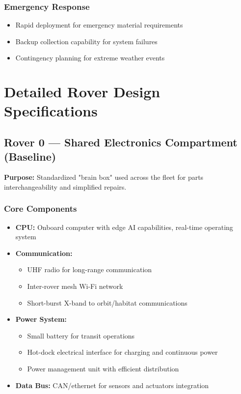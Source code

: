 \documentclass[12pt, a4paper]{article}
\begin{document}
\subsubsection{Emergency Response}
\begin{itemize}
    \item Rapid deployment for emergency material requirements
    \item Backup collection capability for system failures
    \item Contingency planning for extreme weather events
\end{itemize}

\section{Detailed Rover Design Specifications}

\subsection{Rover 0 — Shared Electronics Compartment (Baseline)}

\textbf{Purpose:} Standardized "brain box" used across the fleet for parts interchangeability and simplified repairs.

\subsubsection{Core Components}
\begin{itemize}
    \item \textbf{CPU:} Onboard computer with edge AI capabilities, real-time operating system
    \item \textbf{Communication:} 
    \begin{itemize}
        \item UHF radio for long-range communication
        \item Inter-rover mesh Wi-Fi network
        \item Short-burst X-band to orbit/habitat communications
    \end{itemize}
    \item \textbf{Power System:}
    \begin{itemize}
        \item Small battery for transit operations
        \item Hot-dock electrical interface for charging and continuous power
        \item Power management unit with efficient distribution
    \end{itemize}
    \item \textbf{Data Bus:} CAN/ethernet for sensors and actuators integration
\end{itemize}
\end{document}

